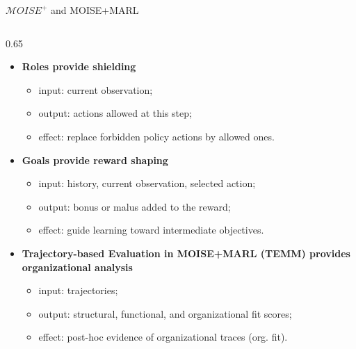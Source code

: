 \documentclass[aspectratio=169]{beamer}
\begin{document}
\begin{frame}{$\mathcal{M}OISE^+$ and MOISE+MARL}
\begin{columns}[c,totalwidth=\textwidth]
\begin{column}{0.65\textwidth}
\begin{itemize}
        \item \scriptsize \textbf{Roles provide shielding}
              \begin{itemize}
                \setlength{\itemsep}{0pt}
                \item \scriptsize input: current observation;
                \item \scriptsize output: actions allowed at this step;
                \item \scriptsize effect: replace forbidden policy actions by allowed ones.
              \end{itemize}

        \item \scriptsize \textbf{Goals provide reward shaping}
              \begin{itemize}
                \setlength{\itemsep}{0pt}
                \item \scriptsize input: history, current observation, selected action;
                \item \scriptsize output: bonus or malus added to the reward;
                \item \scriptsize effect: guide learning toward intermediate objectives.
              \end{itemize}

        \item \scriptsize \textbf{Trajectory-based Evaluation in MOISE+MARL (TEMM) provides organizational analysis}
              \begin{itemize}
                \setlength{\itemsep}{0pt}
                \item \scriptsize input: trajectories;
                \item \scriptsize output: structural, functional, and organizational fit scores;
                \item \scriptsize effect: post-hoc evidence of organizational traces (org. fit).
              \end{itemize}
      \end{itemize}
    \end{column}
  \end{columns}

\end{frame}
\end{document}
